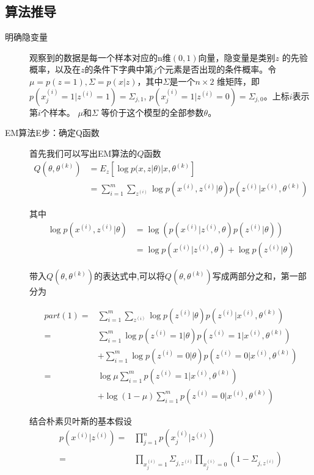 \documentclass[a4paper,oneside,12pt]{article}
\begin{document}
\begin{spacing}{1.5}
\subsection{算法推导}
\begin{description}
  \item[明确隐变量] 观察到的数据是每一个样本对应的n维$(0,1)$向量，隐变量是类别$z$ 的先验概率，以及在$z$的条件下字典中第$j$个元素是否出现的条件概率。令$\mu = p(z=1),\Sigma=p(x|z)$，其中$\Sigma$是一个$n \times 2$ 维矩阵，即$p(x^{(i)}_j=1|z^{(i)}=1) =\Sigma_{j,1}$,
      $  p(x^{(i)}_j=1|z^{(i)}=0) =\Sigma_{j,0}$。上标$i$表示第$i$个样本。
      $\mu$和$\Sigma$ 等价于这个模型的全部参数$\theta$。

      \item[EM算法E步：确定Q函数] 首先我们可以写出EM算法的$Q$函数
        \begin{align*}
        Q(\theta,\theta^{(k)}) & =E_z[\log p(x,z|\theta)|x,\theta^{(k)}] \\
         & =\sum_{i=1}^{m} \sum_{z^{(i)}}\log p(x^{(i)},z^{(i)}|\theta)p(z^{(i)}|x^{(i)},\theta ^{(k)})
      \end{align*}

      其中
      \begin{align*}
        \log p(x^{(i)},z^{(i)}|\theta) &=\log ( p(x^{(i)}|z^{(i)},\theta) p(z^{(i)}|\theta)) \\
         &=\log p(x^{(i)}|z^{(i)},\theta)+\log p(z^{(i)}|\theta)
      \end{align*}

      带入$Q(\theta,\theta^{(k)})$的表达式中,可以将$Q(\theta,\theta^{(k)})$写成两部分之和，第一部分为

      \begin{align}\label{p1}
        part(1) = &\sum_{i=1}^{m} \sum_{z^{(i)}} \log p(z^{(i)}|\theta)p(z^{(i)}|x^{(i)},\theta ^{(k)}) \\
        = &\sum_{i=1}^{m} \log p(z^{(i)}=1|\theta)p(z^{(i)}=1|x^{(i)},\theta ^{(k)}) \\
         &+\sum_{i=1}^{m} \log p(z^{(i)}=0|\theta)p(z^{(i)}=0|x^{(i)},\theta ^{(k)}) \\
         = & \log \mu \sum_{i=1}^{m}  p(z^{(i)}=1|x^{(i)},\theta ^{(k)}) \\
          & + \log(1-\mu) \sum_{i=1}^{m} p(z^{(i)}=0|x^{(i)},\theta ^{(k)})
      \end{align}

      结合朴素贝叶斯的基本假设
      \begin{align*}
        p(x^{(i)}|z^{(i)})=&\prod_{j=1}^n p(x^{(i)}_j|z^{(i)})  \\
         = & \prod_{x^{(i)}_j=1} \Sigma_{j,z^{(i)}} \prod_{x^{(i)}_j=0}(1-\Sigma_{j,z^{(i)}}) \\
      \end{align*}


\end{description}
\end{spacing}
\end{document}
